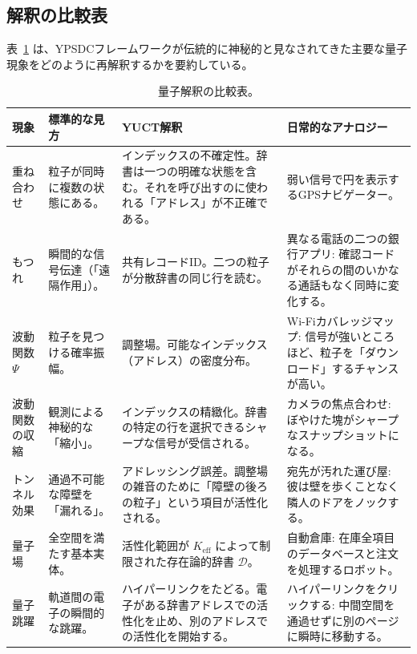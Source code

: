 \documentclass[12pt,a4paper]{article}
\theoremstyle{definition}
\theoremstyle{remark}
\begin{document}
	\subsection{解釈の比較表}
	
	表~\ref{tab:quantum-interpretations} は、YPSDCフレームワークが伝統的に神秘的と見なされてきた主要な量子現象をどのように再解釈するかを要約している。
	
	\begin{table}[H]
		\centering
		\caption{量子解釈の比較表。}
		\label{tab:quantum-interpretations}
		\small
		\begin{tabularx}{\textwidth}{p{2.5cm} p{2.8cm} p{4.2cm} p{4.5cm}}
			\toprule
			\textbf{現象} & \textbf{標準的な見方} & \textbf{YUCT解釈} & \textbf{日常的なアナロジー} \\
			\midrule
			重ね合わせ &
			粒子が同時に複数の状態にある。 &
			インデックスの不確定性。辞書は一つの明確な状態を含む。それを呼び出すのに使われる「アドレス」が不正確である。 &
			弱い信号で円を表示するGPSナビゲーター。 \\
			\addlinespace
			もつれ &
			瞬間的な信号伝達（「遠隔作用」）。 &
			共有レコードID。二つの粒子が分散辞書の同じ行を読む。 &
			異なる電話の二つの銀行アプリ: 確認コードがそれらの間のいかなる通話もなく同時に変化する。 \\
			\addlinespace
			波動関数 $ \Psi $ &
			粒子を見つける確率振幅。 &
			調整場。可能なインデックス（アドレス）の密度分布。 &
			Wi-Fiカバレッジマップ: 信号が強いところほど、粒子を「ダウンロード」するチャンスが高い。 \\
			\addlinespace
			波動関数の収縮 &
			観測による神秘的な「縮小」。 &
			インデックスの精緻化。辞書の特定の行を選択できるシャープな信号が受信される。 &
			カメラの焦点合わせ: ぼやけた塊がシャープなスナップショットになる。 \\
			\addlinespace
			トンネル効果 &
			通過不可能な障壁を「漏れる」。 &
			アドレッシング誤差。調整場の雑音のために「障壁の後ろの粒子」という項目が活性化される。 &
			宛先が汚れた運び屋: 彼は壁を歩くことなく隣人のドアをノックする。 \\
			\addlinespace
			量子場 &
			全空間を満たす基本実体。 &
			活性化範囲が $K_{\mathrm{eff}}$ によって制限された存在論的辞書 $\mathcal{D}$。 &
			自動倉庫: 在庫全項目のデータベースと注文を処理するロボット。 \\
			\addlinespace
			量子跳躍 &
			軌道間の電子の瞬間的な跳躍。 &
			ハイパーリンクをたどる。電子がある辞書アドレスでの活性化を止め、別のアドレスでの活性化を開始する。 &
			ハイパーリンクをクリックする: 中間空間を通過せずに別のページに瞬時に移動する。 \\
			\bottomrule
		\end{tabularx}
	\end{table}
	
\end{document}
